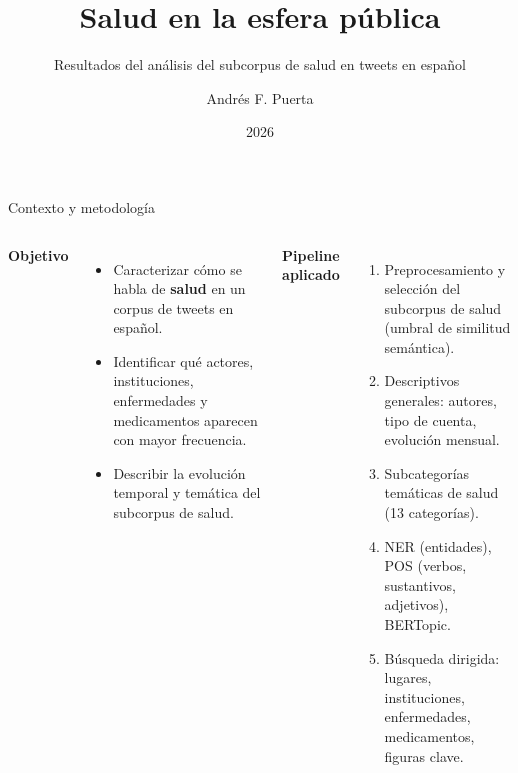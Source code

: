 \documentclass[10pt, aspectratio=169]{beamer}
\title[Salud en la esfera pública]{Salud en la esfera pública}
\subtitle{Resultados del análisis del subcorpus de salud en tweets en español}
\author{Andrés F. Puerta}
\date{2026}
\begin{document}
\begin{frame}
    \titlepage
\end{frame}

\begin{frame}{Contexto y metodología}

  \begin{columns}[T]
      \textbf{Objetivo}
      \begin{itemize}
        \item Caracterizar c\'omo se habla de \textbf{salud}
              en un corpus de tweets en espa\~nol.
        \item Identificar qu\'e actores, instituciones,
              enfermedades y medicamentos aparecen con
              mayor frecuencia.
        \item Describir la evoluci\'on temporal y tem\'atica
              del subcorpus de salud.
      \end{itemize}

      \textbf{Pipeline aplicado}
      \begin{enumerate}
        \item Preprocesamiento y selecci\'on del subcorpus
              de salud (umbral de similitud sem\'antica).
        \item Descriptivos generales: autores, tipo de
              cuenta, evoluci\'on mensual.
        \item Subcategor\'ias tem\'aticas de salud
              (13 categor\'ias).
        \item NER (entidades), POS (verbos, sustantivos,
              adjetivos), BERTopic.
        \item B\'usqueda dirigida: lugares, instituciones,
              enfermedades, medicamentos, figuras clave.
      \end{enumerate}
  \end{columns}

\end{frame}
\end{document}
